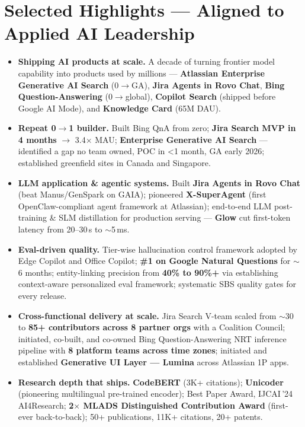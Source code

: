 \documentclass[10.5pt,letterpaper]{article}
\begin{document}
\section*{Selected Highlights --- Aligned to Applied AI Leadership}
\begin{itemize}
  \item \textbf{Shipping AI products at scale.} A decade of turning frontier model capability into products used by millions --- \textbf{Atlassian Enterprise Generative AI Search} (0$\to$GA), \textbf{Jira Agents in Rovo Chat}, \textbf{Bing Question-Answering} (0$\to$global), \textbf{Copilot Search} (shipped before Google AI Mode), and \textbf{Knowledge Card} (65M DAU).
  \item \textbf{Repeat 0$\to$1 builder.} Built Bing QnA from zero; \textbf{Jira Search MVP in 4 months} $\to$ 3.4$\times$ MAU; \textbf{Enterprise Generative AI Search} --- identified a gap no team owned, POC in <1 month, GA early 2026; established greenfield sites in Canada and Singapore.
  \item \textbf{LLM application \& agentic systems.} Built \textbf{Jira Agents in Rovo Chat} (beat Manus/GenSpark on GAIA); pioneered \textbf{X-SuperAgent} (first OpenClaw-compliant agent framework at Atlassian); end-to-end LLM post-training \& SLM distillation for production serving --- \textbf{Glow} cut first-token latency from 20--30\,s to $\sim$5\,ms.
  \item \textbf{Eval-driven quality.} Tier-wise hallucination control framework adopted by Edge Copilot and Office Copilot; \textbf{\#1 on Google Natural Questions} for $\sim$6 months; entity-linking precision from \textbf{40\% to 90\%+} via establishing context-aware personalized eval framework; systematic SBS quality gates for every release.
  \item \textbf{Cross-functional delivery at scale.} Jira Search V-team scaled from $\sim$30 to \textbf{85+ contributors across 8 partner orgs} with a Coalition Council; initiated, co-built, and co-owned Bing Question-Answering NRT inference pipeline with \textbf{8 platform teams across time zones}; initiated and established \textbf{Generative UI Layer --- Lumina} across Atlassian 1P apps.
  \item \textbf{Research depth that ships.} \textbf{CodeBERT} (3K+ citations); \textbf{Unicoder} (pioneering multilingual pre-trained encoder); Best Paper Award, IJCAI\,'24 AI4Research; \textbf{2$\times$ MLADS Distinguished Contribution Award} (first-ever back-to-back); 50+ publications, 11K+ citations, 20+ patents.
\end{itemize}
\end{document}
